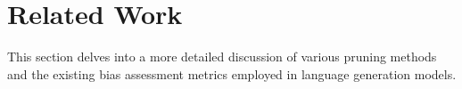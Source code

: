 \documentclass[letterpaper]{article} %
\newcommand{\goncalo}[1]
{\textcolor{orange}{{\bf}{\em #1}{\bf}}}
\begin{document}









\section{Related Work}
This section delves into a more detailed discussion of various pruning methods and the existing bias assessment metrics employed in language generation models.
\end{document}
